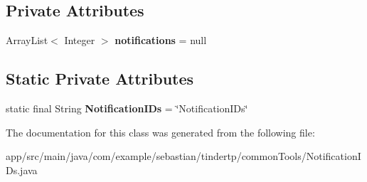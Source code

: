 \subsection*{Private Attributes}
\begin{DoxyCompactItemize}
\item 
Array\+List$<$ Integer $>$ {\bfseries notifications} = null\hypertarget{classcom_1_1example_1_1sebastian_1_1tindertp_1_1commonTools_1_1NotificationIDs_aefda34a6d776a58b1732245f06e0b3b3}{}\label{classcom_1_1example_1_1sebastian_1_1tindertp_1_1commonTools_1_1NotificationIDs_aefda34a6d776a58b1732245f06e0b3b3}

\end{DoxyCompactItemize}
\subsection*{Static Private Attributes}
\begin{DoxyCompactItemize}
\item 
static final String {\bfseries Notification\+I\+Ds} = \char`\"{}Notification\+I\+Ds\char`\"{}\hypertarget{classcom_1_1example_1_1sebastian_1_1tindertp_1_1commonTools_1_1NotificationIDs_a06fa9f729b459e58784e98e7369a6d9c}{}\label{classcom_1_1example_1_1sebastian_1_1tindertp_1_1commonTools_1_1NotificationIDs_a06fa9f729b459e58784e98e7369a6d9c}

\end{DoxyCompactItemize}


The documentation for this class was generated from the following file\+:\begin{DoxyCompactItemize}
\item 
app/src/main/java/com/example/sebastian/tindertp/common\+Tools/Notification\+I\+Ds.\+java\end{DoxyCompactItemize}
